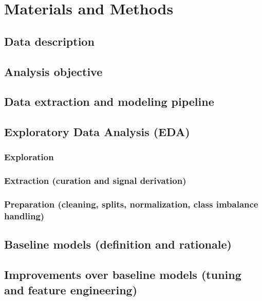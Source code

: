 \chapter{Materials and Methods}\label{chap:materials-methods}

\section{Data description}\label{sec:data-description}

\section{Analysis objective}\label{sec:analysis-objective}

\section{Data extraction and modeling pipeline}\label{sec:data-pipeline}

\section{Exploratory Data Analysis (EDA)}\label{sec:eda}
\subsection{Exploration}\label{subsec:eda-exploration}
\subsection{Extraction (curation and signal derivation)}\label{subsec:eda-extraction}
\subsection{Preparation (cleaning, splits, normalization, class imbalance handling)}\label{subsec:eda-preparation}

\section{Baseline models (definition and rationale)}\label{sec:baseline-models}

\section{Improvements over baseline models (tuning and feature engineering)}\label{sec:improvements}

